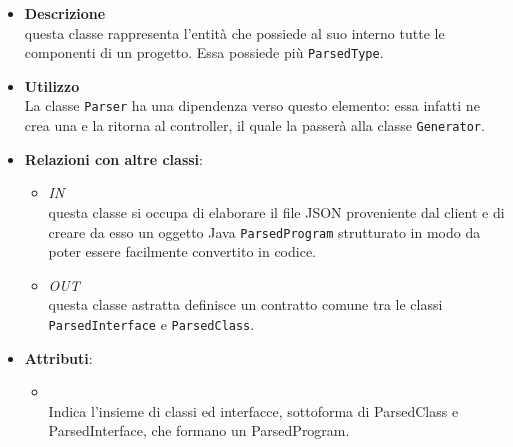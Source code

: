 \label{\nogloxy{swedesigner::server::project::ParsedProgram}}
\begin{figure}[h]
\centering
{}
\caption{}
\end{figure}
\FloatBarrier
\begin{itemize}
\item \textbf{Descrizione}\\
questa classe rappresenta l'entità che possiede al suo interno tutte le componenti di un progetto. Essa possiede più \texttt{ParsedType}.
\item \textbf{Utilizzo}\\
La classe \texttt{Parser} ha una dipendenza verso questo elemento: essa infatti ne crea una e la ritorna al controller, il quale la passerà alla classe \texttt{Generator}.
\item \textbf{Relazioni con altre classi}:
\begin{itemize}
\item \textit{IN} \hyperref[\nogloxy{swedesigner::server::parser::Parser}]{}\\
questa classe si occupa di elaborare il file JSON proveniente dal client e di creare da esso un oggetto Java \texttt{ParsedProgram} strutturato in modo da poter essere facilmente convertito in codice.
\item \textit{OUT} \hyperref[\nogloxy{swedesigner::server::project::ParsedType}]{}\\
questa classe astratta definisce un contratto comune tra le classi \texttt{ParsedInterface} e \texttt{ParsedClass}. 
\end{itemize}
\item \textbf{Attributi}:
\begin{itemize}
\item {}
\\ Indica l'insieme di classi ed interfacce, sottoforma di ParsedClass e ParsedInterface, che formano un ParsedProgram.

\end{itemize}
\end{itemize}
